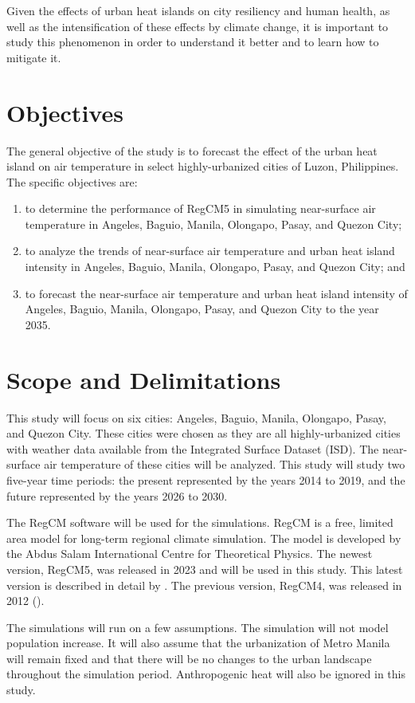 	Given the effects of urban heat islands on city resiliency and human health,
		as well as the intensification of these effects by climate change,
		it is important to study this phenomenon in order to understand it better and to learn how to mitigate it.

\section{Objectives}
	The general objective of the study is to forecast the effect of the urban heat island on air temperature in select highly-urbanized cities of Luzon, Philippines.
	The specific objectives are:
	\begin{enumerate}
		\item to determine the performance of RegCM5 in simulating near-surface air temperature in Angeles, Baguio, Manila, Olongapo, Pasay, and Quezon City;
		\item to analyze the trends of near-surface air temperature and urban heat island intensity in Angeles, Baguio, Manila, Olongapo, Pasay, and Quezon City; and
		\item to forecast the near-surface air temperature and urban heat island intensity of Angeles, Baguio, Manila, Olongapo, Pasay, and Quezon City to the year 2035.
	\end{enumerate}
	

\section{Scope and Delimitations}
	This study will focus on six cities: Angeles, Baguio, Manila, Olongapo, Pasay, and Quezon City.
	These cities were chosen as they are all highly-urbanized cities with weather data available from the Integrated Surface Dataset (ISD).
	The near-surface air temperature of these cities will be analyzed.
	This study will study two five-year time periods: 
		the present represented by the years 2014 to 2019, 
		and the future represented by the years 2026 to 2030.

	The RegCM software will be used for the simulations.
	RegCM is a free, limited area model for long-term regional climate simulation.
	The model is developed by the Abdus Salam International Centre for Theoretical Physics.
	The newest version, RegCM5, was released in 2023 and will be used in this study.
	This latest version is described in detail by \textcite{Giorgi2023}. 
	The previous version, RegCM4, was released in 2012 (\textcite{Giorgi2012}).
	
	The simulations will run on a few assumptions.
	The simulation will not model population increase.
	It will also assume that the urbanization of Metro Manila will remain fixed and that there will be no changes to the urban landscape throughout the simulation period.
	Anthropogenic heat will also be ignored in this study.